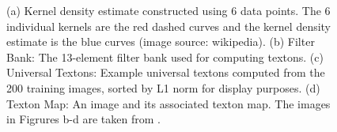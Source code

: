 \documentclass{SMBV12}
\begin{document}
\begin{figure}[htbp]
    \centering
    \caption{ (a) Kernel density estimate constructed using 6 data points. The 6 individual kernels are the red dashed curves and the kernel density estimate is the blue curves (image source: wikipedia). (b) Filter Bank: The 13-element filter bank used for computing textons. (c) Universal Textons: Example universal textons computed from the 200 training images, sorted by L1 norm for display purposes. (d) Texton Map: An image and its associated texton map. The images in Figrures b-d are taken from \cite{martin2004learning}.} 
\end{figure}
\end{document}
